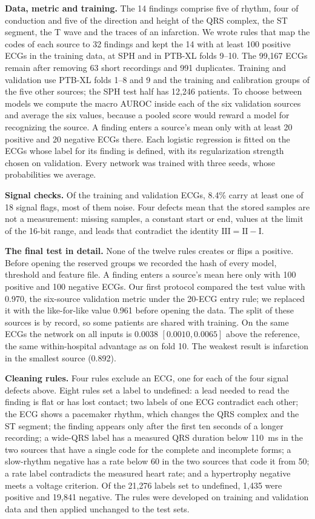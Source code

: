 \documentclass[letterpaper,11pt]{article}
\begin{document}
\textbf{Data, metric and training.} The 14 findings comprise five of rhythm, four of conduction and five of the direction and height of the QRS complex, the ST segment, the T wave and the traces of an infarction. We wrote rules that map the codes of each source to 32 findings and kept the 14 with at least 100 positive ECGs in the training data, at SPH and in PTB-XL folds 9--10. The 99,167 ECGs remain after removing 63 short recordings and 991 duplicates. Training and validation use PTB-XL folds 1--8 and 9 and the training and calibration groups of the five other sources; the SPH test half has 12,246 patients. To choose between models we compute the macro AUROC inside each of the six validation sources and average the six values, because a pooled score would reward a model for recognizing the source. A finding enters a source's mean only with at least 20 positive and 20 negative ECGs there. Each logistic regression is fitted on the ECGs whose label for its finding is defined, with its regularization strength chosen on validation. Every network was trained with three seeds, whose probabilities we average.

\textbf{Signal checks.} Of the training and validation ECGs, 8.4\% carry at least one of 18 signal flags, most of them noise. Four defects mean that the stored samples are not a measurement: missing samples, a constant start or end, values at the limit of the 16-bit range, and leads that contradict the identity $\text{III} = \text{II} - \text{I}$.

\textbf{The final test in detail.} None of the twelve rules creates or flips a positive. Before opening the reserved groups we recorded the hash of every model, threshold and feature file. A finding enters a source's mean here only with 100 positive and 100 negative ECGs. Our first protocol compared the test value with 0.970, the six-source validation metric under the 20-ECG entry rule; we replaced it with the like-for-like value 0.961 before opening the data. The split of these sources is by record, so some patients are shared with training. On the same ECGs the network on all inputs is $0.0038$ $[0.0010, 0.0065]$ above the reference, the same within-hospital advantage as on fold 10. The weakest result is infarction in the smallest source (0.892).

\textbf{Cleaning rules.} Four rules exclude an ECG, one for each of the four signal defects above. Eight rules set a label to undefined: a lead needed to read the finding is flat or has lost contact; two labels of one ECG contradict each other; the ECG shows a pacemaker rhythm, which changes the QRS complex and the ST segment; the finding appears only after the first ten seconds of a longer recording; a wide-QRS label has a measured QRS duration below 110~ms in the two sources that have a single code for the complete and incomplete forms; a slow-rhythm negative has a rate below 60 in the two sources that code it from 50; a rate label contradicts the measured heart rate; and a hypertrophy negative meets a voltage criterion. Of the 21,276 labels set to undefined, 1,435 were positive and 19,841 negative. The rules were developed on training and validation data and then applied unchanged to the test sets.
\end{document}
